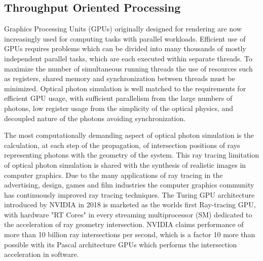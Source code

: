 \documentclass{webofc}
\begin{document}
\subsection{Throughput Oriented Processing}
%
Graphics Processing Units (GPUs) originally designed for rendering 
are now increasingly used for computing tasks with parallel workloads.
Efficient use of GPUs requires problems which can be divided into 
many thousands of mostly independent parallel tasks, which are 
each executed within separate threads. To maximize the number of simultaneous 
running threads the use of resources such as registers, shared 
memory and synchronization between threads must be minimized.
%
Optical photon simulation is well matched to 
the requirements for efficient GPU usage, with sufficient parallelism from 
the large numbers of photons, low register usage from the simplicity of 
the optical physics, and decoupled nature of the photons avoiding synchronization.

The most computationally demanding aspect of optical photon simulation 
is the calculation, at each step of the propagation, 
of intersection positions of rays representing photons with the geometry of the system.
This ray tracing limitation of optical photon simulation is shared 
with the synthesis of realistic images in computer graphics. Due to the many applications
of ray tracing in the advertising, design, games and film industries the computer graphics
community has continuously improved ray tracing techniques. The Turing GPU architecture 
introduced by NVIDIA in 2018 is marketed as the worlds first Ray-tracing GPU, with   
hardware "RT Cores" in every streaming multiprocessor (SM) dedicated to the 
acceleration of ray geometry intersection.
NVIDIA claims performance of more than 10 billion ray intersections 
per second, which is a factor 10 more than possible with its Pascal architecture GPUs
which performs the intersection acceleration in software. 
\end{document}
